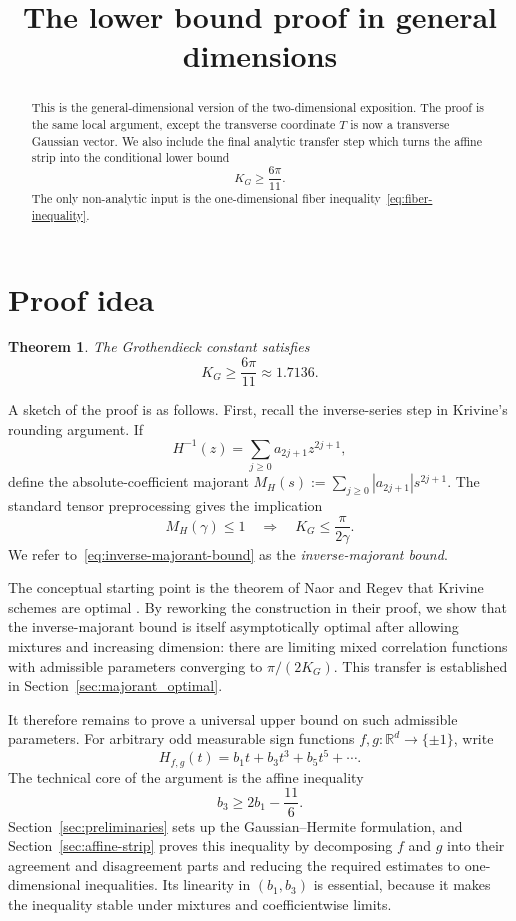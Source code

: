 \documentclass[11pt]{article}
\title{The lower bound proof in general dimensions}
\author{}
\newtheorem{theorem}{Theorem}[section]
\numberwithin{equation}{section}
\newcommand{\R}{\mathbb R}
\begin{document}
\maketitle

\begin{abstract}
\noindent This is the general-dimensional version of the two-dimensional exposition. The proof is the same local argument, except the transverse coordinate $T$ is now a transverse Gaussian vector. We also include the final analytic transfer step which turns the affine strip into the conditional lower bound
\[
        K_G\ge \frac{6\pi}{11}.
\]
The only non-analytic input is the one-dimensional fiber inequality~\eqref{eq:fiber-inequality}.
\end{abstract}

\tableofcontents

\section{Proof idea}
\label{sec:proof-idea}

\begin{theorem}\label{thm:lower-bound}
The Grothendieck constant satisfies
\[
        K_G\ge\frac{6\pi}{11} \approx 1.7136.
\]
\end{theorem}

A sketch of the proof is as follows. First, recall the inverse-series step in Krivine's rounding argument. If
\[
        H^{-1}(z)=\sum_{j\ge0}a_{2j+1}z^{2j+1},
\]
define the absolute-coefficient majorant $M_H(s):=\sum_{j\ge0}|a_{2j+1}|s^{2j+1}$. The standard tensor preprocessing gives the implication
\begin{equation}
        M_H(\gamma)\le1
        \quad\Longrightarrow\quad
        K_G\le\frac{\pi}{2\gamma}.
        \label{eq:inverse-majorant-bound}
\end{equation}
We refer to~\eqref{eq:inverse-majorant-bound} as the \emph{inverse-majorant bound}.

The conceptual starting point is the theorem of Naor and Regev that Krivine schemes are optimal \cite{naor2014krivine}. By reworking the construction in their proof, we show that the inverse-majorant bound is itself asymptotically optimal after allowing mixtures and increasing dimension: there are limiting mixed correlation functions with admissible parameters converging to $\pi/(2K_G)$. This transfer is established in Section~\ref{sec:majorant_optimal}.

It therefore remains to prove a universal upper bound on such admissible parameters. For arbitrary odd measurable sign functions $f,g:\R^d\to\{\pm1\}$, write
\[
        H_{f,g}(t)=b_1t+b_3t^3+b_5t^5+\cdots.
\]
The technical core of the argument is the affine inequality
\[
        b_3\ge 2b_1-\frac{11}{6}.
\]
Section~\ref{sec:preliminaries} sets up the Gaussian--Hermite formulation, and Section~\ref{sec:affine-strip} proves this inequality by decomposing $f$ and $g$ into their agreement and disagreement parts and reducing the required estimates to one-dimensional inequalities. Its linearity in $(b_1,b_3)$ is essential, because it makes the inequality stable under mixtures and coefficientwise limits.
\end{document}
